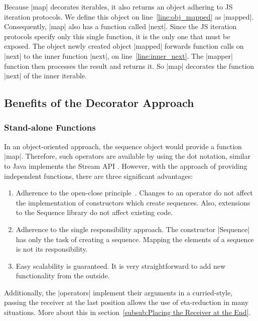 Because |map| decorates iterables, it also returns an object adhering to JS
iteration protocols. We define this object on line~\ref{line:obj_mapped} as
|mapped|. Consequently, |map| also has a function called |next|. Since the JS
iteration protocols specify only this single function, it is the only one that
must be exposed. The object newly created object |mapped| forwards function
calls on |next| to the inner function |next|, on line~\ref{line:inner_next}.
The |mapper| function then processes the result and returns it. So |map|
decorates the function |next| of the inner iterable.

\subsection{Benefits of the Decorator Approach}
\label{sub:Benefits of the Decorator Approach}
\subsubsection{Stand-alone Functions}
\label{subsub:Standalone Functions}
In an object-oriented approach, the sequence object would provide a function
|map|. Therefore, such operators are available by using the dot notation,
similar to Java implements the Stream API \cite{java_stream}. 
However, with the approach of providing independent functions, there 
are three significant advantages:

\begin{enumerate}
  \item {Adherence to the open-close
      principle~\cite[p.~3]{eilebrecht_patterns_2019}. Changes to an operator
      do not affect the implementation of constructors which create sequences. Also,
      extensions to the Sequence library do not affect existing code.
    }
  \item{Adherence to the single responsibility approach. The constructor
    |Sequence| has only the task of creating a sequence. Mapping the elements
  of a sequence is not its responsibility. }
  \item{Easy scalability is guaranteed. It is very straightforward to add new
    functionality from the outside. }
\end{enumerate}

Additionally, the |operators| implement their arguments in a curried-style,
passing the receiver at the last position allows the use of eta-reduction in
many situations. More about this in section~\ref{subsub:Placing the Receiver at
the End}.

